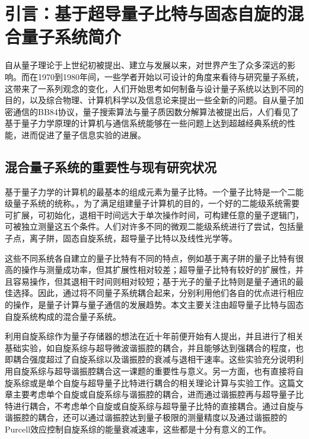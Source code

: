 \chapter{引言：基于超导量子比特与固态自旋的混合量子系统简介}
\label{cha:intro}




        自从量子理论于上世纪初被提出、建立与发展以来，对世界产生了众多深远的影响。而在1970到1980年间，一些学者开始以可设计的角度来看待与研究量子系统\cite{feynman1982simulating}，这带来了一系列观念的变化，人们开始思考如何制备与设计量子系统以达到不同的目的，以及综合物理、计算机科学以及信息论来提出一些全新的问题。\cite{nielsen2002quantum}自从量子加密通信的BB84协议\cite{bennett1984quantum}，量子搜索算法\cite{grover1996fast}与量子质因数分解算法\cite{shor1994algorithms}被提出后，人们看见了基于量子力学原理的计算机与通信系统能够在一些问题上达到超越经典系统的性能，进而促进了量子信息实验的进展。

        \section{混合量子系统的重要性与现有研究状况} %
        \label{sec:importance}

            基于量子力学的计算机的最基本的组成元素为量子比特。一个量子比特是一个二能级量子系统的统称。，为了满足组建量子计算机的目的，一个好的二能级系统需要可扩展，可初始化，退相干时间远大于单次操作时间，可构建任意的量子逻辑门，可被独立测量这五个条件\cite{divincenzo2000physical}。人们对许多不同的微观二能级系统进行了尝试，包括量子点\cite{loss1998quantum}，离子阱\cite{haffner2008quantum}，固态自旋系统\cite{gershenfeld1997bulk}，超导量子比特\cite{devoret2013superconducting}以及线性光学\cite{kok2007linear}等。

            这些不同系统各自建立的量子比特有不同的特点，例如基于离子阱的量子比特有很高的操作与测量成功率，但其扩展性相对较差；超导量子比特有较好的扩展性，并且容易操作，但其退相干时间则相对较短；基于光子的量子比特则是量子通讯的最佳选择。因此，通过将不同量子系统耦合起来，分别利用他们各自的优点进行相应的操作，是量子计算与量子通信的发展趋势。本文主要关注由超导量子比特与固态自旋系统构成的混合量子系统。


            利用自旋系综作为量子存储器的想法在近十年前便开始有人提出\cite{Dutt2007,Imamoglu2009,Wesenberg2009}，并且进行了相关基础实验，如自旋系综与超导微波谐振腔的耦合\cite{Schuster2010}，并且能够达到强耦合的程度\cite{kubo2010}，也即耦合强度超过了自旋系综以及谐振腔的衰减与退相干速率。这些实验充分说明利用自旋系综与超导谐振腔耦合这一课题的重要性与意义。另一方面，也有直接将自旋系综或是单个自旋与超导量子比特进行耦合的相关理论计算\cite{Marcos2010}与实验工作\cite{Zhu2011,Mark2013}。这篇文章主要考虑单个自旋或自旋系综与谐振腔的耦合，进而通过谐振腔再与超导量子比特进行耦合，不考虑单个自旋或自旋系综与超导量子比特的直接耦合。通过自旋与谐振腔的耦合，还可以通过谐振腔达到量子极限的测量精度\cite{Bienfait2016a}以及通过谐振腔的Purcell效应控制自旋系综的能量衰减速率\cite{Bienfait2016b}，这些都是十分有意义的工作。

